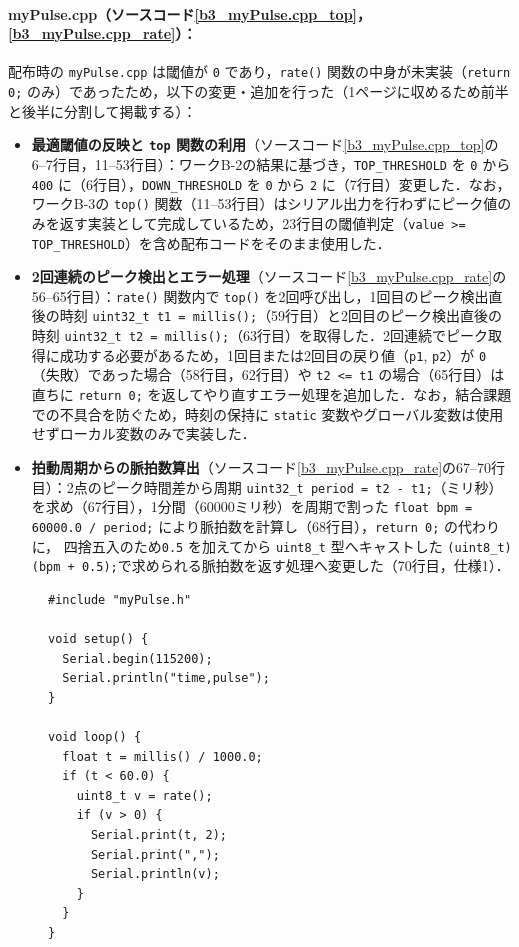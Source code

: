 \paragraph{myPulse.cpp（ソースコード\ref{b3_myPulse.cpp_top}，\ref{b3_myPulse.cpp_rate}）：}
配布時の \texttt{myPulse.cpp} は閾値が \texttt{0} であり，\texttt{rate()} 関数の中身が未実装（\texttt{return 0;} のみ）であったため，以下の変更・追加を行った（1ページに収めるため前半と後半に分割して掲載する）：
\begin{itemize}
  \item \textbf{最適閾値の反映と \texttt{top} 関数の利用}（ソースコード\ref{b3_myPulse.cpp_top}の6--7行目，11--53行目）：ワークB-2の結果に基づき，\texttt{TOP\_THRESHOLD} を \texttt{0} から \texttt{400} に（6行目），\texttt{DOWN\_THRESHOLD} を \texttt{0} から \texttt{2} に（7行目）変更した．なお，ワークB-3の \texttt{top()} 関数（11--53行目）はシリアル出力を行わずにピーク値のみを返す実装として完成しているため，23行目の閾値判定（\texttt{value >= TOP\_THRESHOLD}）を含め配布コードをそのまま使用した．
  \item \textbf{2回連続のピーク検出とエラー処理}（ソースコード\ref{b3_myPulse.cpp_rate}の56--65行目）：\texttt{rate()} 関数内で \texttt{top()} を2回呼び出し，1回目のピーク検出直後の時刻 \texttt{uint32\_t t1 = millis();}（59行目）と2回目のピーク検出直後の時刻 \texttt{uint32\_t t2 = millis();}（63行目）を取得した．2回連続でピーク取得に成功する必要があるため，1回目または2回目の戻り値（\texttt{p1}, \texttt{p2}）が \texttt{0}（失敗）であった場合（58行目，62行目）や \texttt{t2 <= t1} の場合（65行目）は直ちに \texttt{return 0;} を返してやり直すエラー処理を追加した．なお，結合課題での不具合を防ぐため，時刻の保持に \texttt{static} 変数やグローバル変数は使用せずローカル変数のみで実装した．
  \item \textbf{拍動周期からの脈拍数算出}（ソースコード\ref{b3_myPulse.cpp_rate}の67--70行目）：2点のピーク時間差から周期 \texttt{uint32\_t period = t2 - t1;}（ミリ秒）を求め（67行目），1分間（60000ミリ秒）を周期で割った \texttt{float bpm = 60000.0 / period;} により脈拍数を計算し（68行目），\texttt{return 0;} の代わりに， 四捨五入のため\texttt{0.5} を加えてから \texttt{uint8\_t} 型へキャストした \texttt{(uint8\_t)(bpm + 0.5);}で求められる脈拍数を返す処理へ変更した（70行目，仕様1）．
\end{itemize}

\begin{figure}[H]
  \begin{lstlisting}[caption=b3\_pulse\_measurement.ino, label=b3_pulse_measurement, escapechar=\@]
#include "myPulse.h"

void setup() {
  Serial.begin(115200);
  Serial.println("time,pulse");
}

void loop() {
  float t = millis() / 1000.0;
  if (t < 60.0) {
    uint8_t v = rate();
    if (v > 0) {
      Serial.print(t, 2);
      Serial.print(",");
      Serial.println(v);
    }
  }
}
    \end{lstlisting}
\end{figure}

